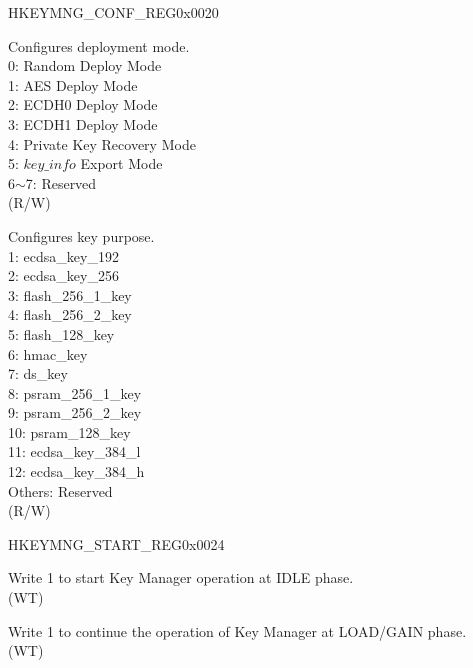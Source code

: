 \begin{register}{H}{KEYMNG\_CONF\_REG}{0x0020}\label{regdesc:KEYMNGCONFREG}
%
%
%
\regnewline%
\begin{regdesc}\begin{reglist}
\label{fielddesc:KEYMNGKGENMODE}\item [KEYMNG\_KGEN\_MODE] Configures deployment mode. \\
0: Random Deploy Mode\\
1: AES Deploy Mode\\
2: ECDH0 Deploy Mode\\
3: ECDH1 Deploy Mode\\
4: Private Key Recovery Mode\\
5: \begin{math}key\_info\end{math} Export Mode\\
6$\sim$7: Reserved\\
(R/W)
\label{fielddesc:KEYMNGKEYPURPOSE}\item [KEYMNG\_KEY\_PURPOSE] Configures key purpose. \\
1: ecdsa\_key\_192 \\
2: ecdsa\_key\_256 \\
3: flash\_256\_1\_key \\
4: flash\_256\_2\_key \\
5: flash\_128\_key \\
6: hmac\_key \\
7: ds\_key \\
8: psram\_256\_1\_key \\
9: psram\_256\_2\_key \\
10: psram\_128\_key \\
11: ecdsa\_key\_384\_l \\
12: ecdsa\_key\_384\_h \\
Others: Reserved\\
(R/W)
\end{reglist}\end{regdesc}
\end{register}


\begin{register}{H}{KEYMNG\_START\_REG}{0x0024}\label{regdesc:KEYMNGSTARTREG}
%
%
%
\regnewline%
\begin{regdesc}\begin{reglist}
\label{fielddesc:KEYMNGSTART}\item [KEYMNG\_START] Write 1 to start Key Manager operation at IDLE phase. \\
(WT)
\label{fielddesc:KEYMNGCONTINUE}\item [KEYMNG\_CONTINUE] Write 1 to continue the operation of Key Manager at LOAD/GAIN phase.\\
(WT)
\end{reglist}\end{regdesc}
\end{register}


